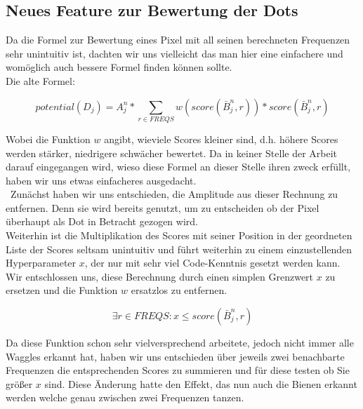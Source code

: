 \documentclass[11pt,a4paper]{article}
\begin{document}
\subsection{Neues Feature zur Bewertung der Dots}
Da die Formel zur Bewertung eines Pixel mit all seinen berechneten Frequenzen sehr unintuitiv ist, dachten wir uns vielleicht das man hier eine einfachere und womöglich auch bessere Formel finden können sollte.\\
Die alte Formel:
\begin{center}
\begin{equation} 
potential(D_j)=A^n_j*\sum_{r\in FREQS}w(score(\bar{B}_j^n, r)) * score(\bar{B}_j^n,r)
\end{equation}
\end{center}
Wobei die Funktion $w$ angibt, wieviele Scores kleiner sind, d.h. höhere Scores werden stärker, niedrigere schwächer bewertet. Da in keiner Stelle der Arbeit darauf eingegangen wird, wieso diese Formel an dieser Stelle ihren zweck erfüllt, haben wir uns etwas einfacheres ausgedacht.\\\
Zunächst haben wir uns entschieden, die Amplitude aus dieser Rechnung zu entfernen. Denn sie wird bereits genutzt, um zu entscheiden ob der Pixel überhaupt als Dot in Betracht gezogen wird.\\
Weiterhin ist die Multiplikation des Scores mit seiner Position in der geordneten Liste der Scores seltsam unintuitiv und führt weiterhin zu einem einzustellenden Hyperparameter $x$, der nur mit sehr viel Code-Kenntnis gesetzt werden kann.
Wir entschlossen uns, diese Berechnung durch einen simplen Grenzwert $x$ zu ersetzen und die Funktion $w$ ersatzlos zu entfernen.
\begin{center}
\begin{equation} 
\exists r\in FREQS : x\le score(\bar{B}_j^n, r)
\end{equation}
\end{center}
Da diese Funktion schon sehr vielversprechend arbeitete, jedoch nicht immer alle Waggles erkannt hat, haben wir uns entschieden über jeweils zwei benachbarte Frequenzen die entsprechenden Scores zu summieren und für diese testen ob Sie größer $x$ sind. Diese Änderung hatte den Effekt, das nun auch die Bienen erkannt werden welche genau zwischen zwei Frequenzen tanzen.
\end{document}
